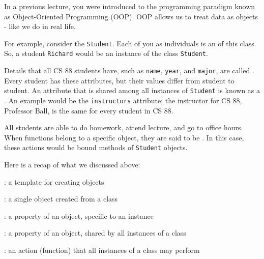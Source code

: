 \begin{blocksection}
In a previous lecture, you were introduced to the programming paradigm known as
Object-Oriented Programming (OOP). OOP allows us to treat data as objects - like
we do in real life.

For example, consider the  \texttt{Student}. Each of
you as individuals is an  of this class.
So, a student \texttt{Richard} would be an instance of the class
\texttt{Student}.

Details that all CS 88 students have, such as \texttt{name}, \texttt{year}, and
\texttt{major}, are called .  Every student has
these attributes, but their values differ from student to student.  An attribute
that is shared among all instances of \texttt{Student} is known as a
.
An example would be the \texttt{instructors} attribute; the instructor for CS 88, Professor Ball, is the same for every student in CS 88.

All students are able to do homework, attend lecture, and go to office hours.
When functions belong to a specific object, they are said to be
.
In this case, these actions would be bound methods of
\texttt{Student} objects.

Here is a recap of what we discussed above:


: a template for creating objects

: a single object created from a class

: a property of an object, specific to an instance

: a property of an object, shared by all instances of a class

: an action (function) that all instances of a class may perform
\end{blocksection}